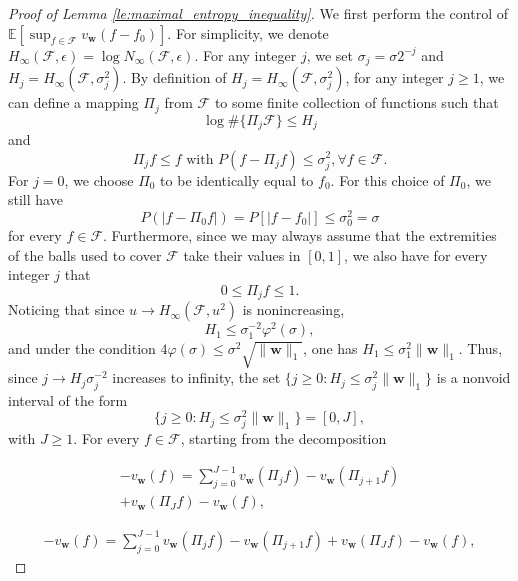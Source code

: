 \documentclass[letterpaper]{article} %
\def\DoubleColumn{}
\def\DoubleColumnEnd{}
\def\SingleColumn{}
\newcommand{\E}{\mathbb{E}}
\newcommand{\weight}{\mathbf{w}}
\newcommand{\normo}[1]{\|#1\|_1}
\begin{document}
\begin{proof}[Proof of Lemma \ref{le:maximal_entropy_inequality}] %
    We first perform the control of $\E[\sup_{f\in\mathcal{F}}v_\weight(f-f_0)]$. For simplicity, we denote $H_\infty(\mathcal{F}, \epsilon)=\log N_\infty(\mathcal{F},\epsilon)$. For any integer $j$, we set $\sigma_j=\sigma2^{-j}$ and $H_j=H_\infty(\mathcal{F},\sigma_j^2)$. By definition of $H_j=H_\infty(\mathcal{F},\sigma_j^2)$, for any integer $j\ge 1$, we can define a mapping $\Pi_j$ from $\mathcal{F}$ to some finite collection of functions such that
    \begin{equation}
        \label{eq:bounded_entropy_mapping}
        \log \#\{\Pi_j\mathcal{F}\}\le H_j
    \end{equation}
    and
    \begin{equation}
        \label{eq:bounded_entropy_condition}
        \Pi_jf\le f \text{ with }P(f-\Pi_jf)\le \sigma_j^2, \forall f\in\mathcal{F}.
    \end{equation}
    For $j=0$, we choose $\Pi_0$ to be identically equal to $f_0$. For this choice of $\Pi_0$, we still have
    \begin{equation}
        \label{eq:bounded_entropy_f0}
        P(|f-\Pi_0f|)=P[|f-f_0|]\le \sigma_0^2=\sigma
    \end{equation}
    for every $f\in\mathcal{F}$. Furthermore, since we may always assume that the extremities of the balls used to cover $\mathcal{F}$ take their values in $[0,1]$, we also have for every integer $j$ that
    \[0\le\Pi_jf\le1.\]
    Noticing that since $u\to H_\infty(\mathcal{F},u^2)$ is nonincreasing,
    \[H_1\le \sigma_1^{-2}\varphi^2(\sigma),\]
    and under the condition $4\varphi(\sigma)\le \sigma^2\sqrt{\normo{\weight{}}}$, one has $H_1\le \sigma_1^2\normo{\weight{}}$. Thus, since $j\to H_j\sigma_j^{-2}$ increases to infinity, the set $\{j\ge 0: H_j\le \sigma_j^2\normo{\weight{}}\}$ is a nonvoid interval of the form
    \[\{j\ge 0: H_j\le \sigma_j^2\normo{\weight{}}\}=[0,J],\]
    with $J\ge 1$. For every $f\in\mathcal{F}$, starting from the decomposition
    \DoubleColumn
    \begin{align*}
    -v_\weight(f)=\sum_{j=0}^{J-1}v_\weight(\Pi_jf)-v_\weight(\Pi_{j+1}f)\\
    +v_\weight(\Pi_Jf)-v_\weight(f),
    \end{align*}
    \DoubleColumnEnd
    \SingleColumn
    \begin{align*}
    -v_\weight(f)=\sum_{j=0}^{J-1}v_\weight(\Pi_jf)-v_\weight(\Pi_{j+1}f)+v_\weight(\Pi_Jf)-v_\weight(f),

\end{align*}
\end{proof}
\end{document}
